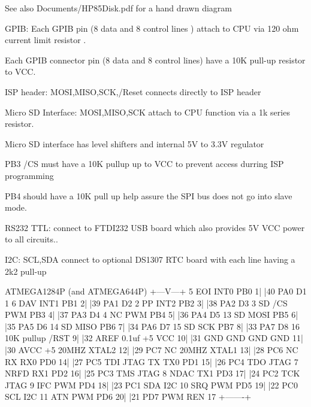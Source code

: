 \begin{DoxyItemize}
\item \begin{DoxySeeAlso}{See also}
Documents/\+H\+P85\+Disk.\+pdf for a hand drawn diagram
\end{DoxySeeAlso}

\item G\+P\+IB\+: Each G\+P\+IB pin (8 data and 8 control lines ) attach to C\+PU via 120 ohm current limit resistor .
\begin{DoxyItemize}
\item Each G\+P\+IB connector pin (8 data and 8 control lines) have a 10K pull-\/up resistor to V\+CC.
\end{DoxyItemize}
\item I\+SP header\+: M\+O\+SI,M\+I\+SO,S\+CK,/\+Reset connects directly to I\+SP header
\item Micro SD Interface\+: M\+O\+SI,M\+I\+SO,S\+CK attach to C\+PU function via a 1k series resistor.
\begin{DoxyItemize}
\item Micro SD interface has level shifters and internal 5V to 3.\+3V regulator
\item P\+B3 /\+CS must have a 10K pullup up to V\+CC to prevent access durring I\+SP programming
\item P\+B4 should have a 10K pull up help assure the S\+PI bus does not go into slave mode.
\end{DoxyItemize}
\item R\+S232 T\+TL\+: connect to F\+T\+D\+I232 U\+SB board which also provides 5V V\+CC power to all circuits..
\item I2C\+: S\+CL,S\+DA connect to optional D\+S1307 R\+TC board with each line having a 2k2 pull-\/up 
\begin{DoxyPre}\end{DoxyPre}



\begin{DoxyPre}                       ATMEGA1284P (and ATMEGA644P) 
                       +---V---+ 
     5 EOI INT0  PB0  1|       |40  PA0      D1  1 
     6 DAV INT1  PB1  2|       |39  PA1      D2  2 
       PP  INT2  PB2  3|       |38  PA2      D3  3 
    SD /CS  PWM  PB3  4|       |37  PA3      D4  4 
       NC   PWM  PB4  5|       |36  PA4      D5 13 
    SD     MOSI  PB5  6|       |35  PA5      D6 14 
    SD     MISO  PB6  7|       |34  PA6      D7 15 
    SD      SCK  PB7  8|       |33  PA7      D8 16 
    10K pullup  /RST  9|       |32  AREF     0.1uf 
       +5        VCC 10|       |31  GND      GND   
       GND       GND 11|       |30  AVCC     +5    
    20MHZ      XTAL2 12|       |29  PC7      NC    
    20MHZ      XTAL1 13|       |28  PC6      NC    
       RX   RX0  PD0 14|       |27  PC5  TDI JTAG 
       TX   TX0  PD1 15|       |26  PC4  TDO JTAG 
     7 NRFD RX1  PD2 16|       |25  PC3  TMS JTAG 
     8 NDAC TX1  PD3 17|       |24  PC2  TCK JTAG 
     9 IFC  PWM  PD4 18|       |23  PC1  SDA I2C   
    10 SRQ  PWM  PD5 19|       |22  PC0  SCL I2C  
    11 ATN  PWM  PD6 20|       |21  PD7  PWM REN 17 
                       +-------+ 
\end{DoxyPre}


\end{DoxyItemize}
